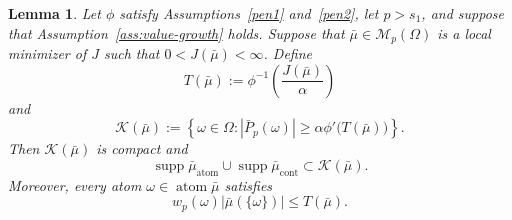 \documentclass[11pt]{amsart}
\newtheorem{lemma}[theorem]{Lemma}
\theoremstyle{definition}
\theoremstyle{remark}
\DeclareMathOperator{\atom}{atom}
\DeclareMathOperator{\cont}{cont}
\DeclareMathOperator{\supp}{supp}
\begin{document}
\begin{lemma}
\label{lem:support-bound}
Let $\phi$ satisfy Assumptions~\ref{pen1} and~\ref{pen2}, let $p>s_1$, and
suppose that Assumption~\ref{ass:value-growth} holds. Suppose that
$\bar\mu\in\mathcal M_p(\Omega)$ is a local minimizer of $J$ such that
$0<J(\bar\mu)<\infty$.  Define
\begin{equation*}
	T(\bar\mu):=\phi^{-1}\!\left(\frac{J(\bar\mu)}{\alpha}\right)
\end{equation*}
and
\begin{equation*}
	\mathcal K(\bar\mu)
	:=\left\{\omega\in\Omega:
	|\bar P_p(\omega)|
	\geq\alpha\phi'\bigl(T(\bar\mu)\bigr)\right\}.
\end{equation*}
Then $\mathcal K(\bar\mu)$ is compact and
\begin{equation}
\label{eq:localized-support}
	\supp\bar\mu_{\atom}\cup\supp\bar\mu_{\cont}
	\subset\mathcal K(\bar\mu).
\end{equation}
Moreover, every atom $\omega\in\atom\bar\mu$ satisfies
\begin{equation*}
	w_p(\omega)|\bar\mu(\{\omega\})|\le T(\bar\mu).
\end{equation*}
\end{lemma}
\end{document}

